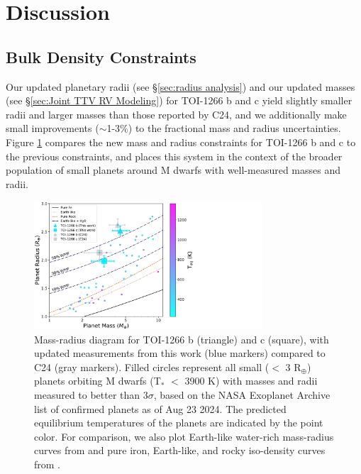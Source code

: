 \documentclass[twocolumn]{aastex631}
\begin{document}
\section{Discussion}  \label{sec:planetary compositions}

\subsection{Bulk Density Constraints}

Our updated planetary radii (see \S\ref{sec:radius analysis}) and our updated masses (see \S\ref{sec:Joint TTV RV Modeling}) for TOI-1266 b and c yield slightly smaller radii and larger masses than those reported by C24, and we additionally make small improvements ($\sim$1-3\%) to the fractional mass and radius uncertainties. Figure \ref{fig:mass_radius} compares the new mass and radius constraints for TOI-1266 b and c to the previous constraints, and places this system in the context of the broader population of small planets around M dwarfs with well-measured masses and radii. 

\begin{figure}
  \includegraphics[width=8.5cm]{MR_Fig.pdf}
  \caption{Mass-radius diagram for TOI-1266 b (triangle) and c (square), with updated measurements from this work (blue markers) compared to C24 (gray markers). Filled circles represent all small ($<$ 3 R$_{\oplus}$) planets orbiting M dwarfs (T$_*$ $<$ 3900 K) with masses and radii measured to better than 3$\sigma$, based on the NASA Exoplanet Archive list of confirmed planets as of Aug 23 2024. The predicted equilibrium temperatures of the planets are indicated by the point color. For comparison, we also plot Earth-like water-rich mass-radius curves from \cite{Aguichine2021} and pure iron, Earth-like, and rocky iso-density curves from \cite{zeng_2016}.
  }
  \label{fig:mass_radius}
\end{figure}
\end{document}
